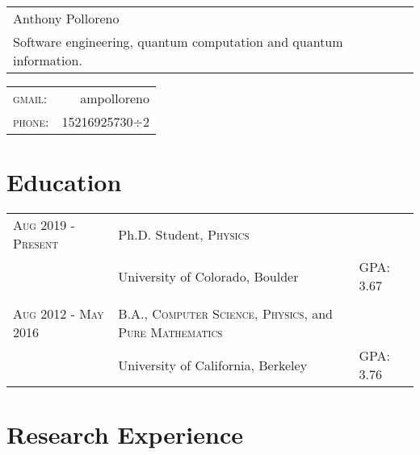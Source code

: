 \documentclass[a4paper,10pt]{article}
\begin{document}
\newcommand*{\fontin}[2]{{\setmainfont{Fontin}#1{#2}}}

\pagestyle{empty} %




\begin{tabular}{p{2.6in}}
{\Huge Anthony Polloreno}\\
Software engineering, quantum computation and quantum information.\\
\end{tabular}
\hfill
\begin{tabular}{lr}
    \fontin{\textsc}{gmail:}     & ampolloreno\\
    \fontin{\textsc}{phone:}     & 15216925730$\div$2
    \end{tabular}

\section{Education}
\begin{tabular}{l|ll}
  \fontin{\textsc}{Aug 2019 - Present} & Ph.D. Student, \fontin{\textsc}{Physics} \\ &University of Colorado, Boulder & GPA: 3.67 \\ \\
  \fontin{\textsc}{Aug 2012 - May 2016} & B.A., \fontin{\textsc}{Computer Science}, \fontin{\textsc}{Physics}, and \fontin{\textsc}{Pure Mathematics} \\ &University of California, Berkeley & GPA: 3.76 \\
\end{tabular}

\section{Research Experience}
\end{document}
